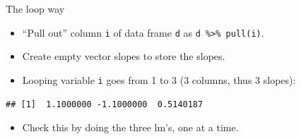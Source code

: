 \documentclass[ignorenonframetext,]{beamer}
\newenvironment{Shaded}{\begin{snugshade}}{\end{snugshade}}
\newcommand{\ControlFlowTok}[1]{\textcolor[rgb]{0.13,0.29,0.53}{\textbf{#1}}}
\newcommand{\DecValTok}[1]{\textcolor[rgb]{0.00,0.00,0.81}{#1}}
\newcommand{\KeywordTok}[1]{\textcolor[rgb]{0.13,0.29,0.53}{\textbf{#1}}}
\newcommand{\NormalTok}[1]{#1}
\newcommand{\OperatorTok}[1]{\textcolor[rgb]{0.81,0.36,0.00}{\textbf{#1}}}
\newcommand{\StringTok}[1]{\textcolor[rgb]{0.31,0.60,0.02}{#1}}
\providecommand{\tightlist}{%
  \setlength{\itemsep}{0pt}\setlength{\parskip}{0pt}}
\begin{document}
\begin{frame}[fragile]{The loop way}
\protect\hypertarget{the-loop-way}{}

\begin{itemize}
\tightlist
\item
  ``Pull out'' column \texttt{i} of data frame \texttt{d} as
  \texttt{d\ \%\textgreater{}\%\ pull(i)}.
\item
  Create empty vector slopes to store the slopes.
\item
  Looping variable \texttt{i} goes from 1 to 3 (3 columns, thus 3
  slopes):
\end{itemize}

\begin{Shaded}
\end{Shaded}

\begin{verbatim}
## [1]  1.1000000 -1.1000000  0.5140187
\end{verbatim}

\begin{itemize}
\tightlist
\item
  Check this by doing the three lm's, one at a time.
\end{itemize}

\end{frame}
\end{document}
